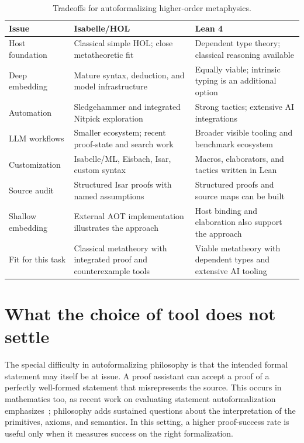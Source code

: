 \documentclass[12pt,leqno]{article}
\begin{document}
\begin{table}[htbp]
\centering
\begin{singlespace}
\small
\renewcommand{\arraystretch}{1.18}
\begin{tabularx}{\textwidth}{@{}>{\raggedright\arraybackslash}p{1.18in}
 >{\raggedright\arraybackslash}X >{\raggedright\arraybackslash}X@{}}
\toprule
\textbf{Issue} & \textbf{Isabelle/HOL} & \textbf{Lean 4}\\
\midrule
Host foundation & Classical simple HOL; close metatheoretic fit & Dependent type theory; classical reasoning available\\
Deep embedding & Mature syntax, deduction, and model infrastructure & Equally viable; intrinsic typing is an additional option\\
Automation & Sledgehammer and integrated Nitpick exploration & Strong tactics; extensive AI integrations\\
LLM workflows & Smaller ecosystem; recent proof-state and search work & Broader visible tooling and benchmark ecosystem\\
Customization & Isabelle/ML, Eisbach, Isar, custom syntax & Macros, elaborators, and tactics written in Lean\\
Source audit & Structured Isar proofs with named assumptions & Structured proofs and source maps can be built\\
Shallow embedding & External AOT implementation illustrates the approach & Host binding and elaboration also support the approach\\
Fit for this task & Classical metatheory with integrated proof and counterexample tools & Viable metatheory with dependent types and extensive AI tooling\\
\bottomrule
\end{tabularx}
\end{singlespace}
\caption{Tradeoffs for autoformalizing higher-order metaphysics.}
\label{tab:comparison}
\end{table}
\FloatBarrier

\section{What the choice of tool does not settle}

The special difficulty in autoformalizing philosophy is that the intended
formal statement may itself be at issue. A proof assistant can accept a
proof of a perfectly well-formed statement that misrepresents the source.
This occurs in mathematics too, as recent work on evaluating statement
autoformalization emphasizes~\cite{evaluation}; philosophy adds sustained
questions about the interpretation of the primitives, axioms, and semantics.
In this setting, a higher proof-success rate is useful only when it measures
success on the right formalization.
\end{document}
